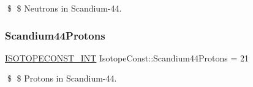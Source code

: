 \$ \$ Neutrons in Scandium-\/44. \mbox{\label{group___isotope_const-_scandium-_sc44_ga664d545f549f194064f6cd6187f7a549}} 
\subsubsection{\texorpdfstring{Scandium44\+Protons}{Scandium44Protons}}
{\footnotesize\ttfamily \mbox{\hyperlink{group___isotope_const-_macros_ga5f18360b3e99483a35c32d789e62621c}{I\+S\+O\+T\+O\+P\+E\+C\+O\+N\+S\+T\+\_\+\+I\+NT}} Isotope\+Const\+::\+Scandium44\+Protons = 21}

\$ \$ Protons in Scandium-\/44. 